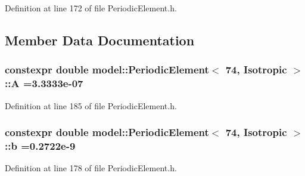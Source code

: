 Definition at line 172 of file Periodic\+Element.\+h.



\subsection{Member Data Documentation}
\hypertarget{structmodel_1_1_periodic_element_3_0174_00_01_isotropic_01_4_a971d43c767f0019dd0b70dc4cc6f0e0b}{}
\subsubsection[{A}]{\setlength{\rightskip}{0pt plus 5cm}constexpr double {\bf model\+::\+Periodic\+Element}$<$ 74, {\bf Isotropic} $>$\+::A =3.\+3333e-\/07\hspace{0.3cm}{\ttfamily [static]}}\label{structmodel_1_1_periodic_element_3_0174_00_01_isotropic_01_4_a971d43c767f0019dd0b70dc4cc6f0e0b}


Definition at line 185 of file Periodic\+Element.\+h.

\hypertarget{structmodel_1_1_periodic_element_3_0174_00_01_isotropic_01_4_aa28f577ac519f2bf9c874c2d37b80450}{}
\subsubsection[{b}]{\setlength{\rightskip}{0pt plus 5cm}constexpr double {\bf model\+::\+Periodic\+Element}$<$ 74, {\bf Isotropic} $>$\+::b =0.\+2722e-\/9\hspace{0.3cm}{\ttfamily [static]}}\label{structmodel_1_1_periodic_element_3_0174_00_01_isotropic_01_4_aa28f577ac519f2bf9c874c2d37b80450}


Definition at line 178 of file Periodic\+Element.\+h.

\hypertarget{structmodel_1_1_periodic_element_3_0174_00_01_isotropic_01_4_adc67798e64c421b46893b4cf39eb9f29}{}

